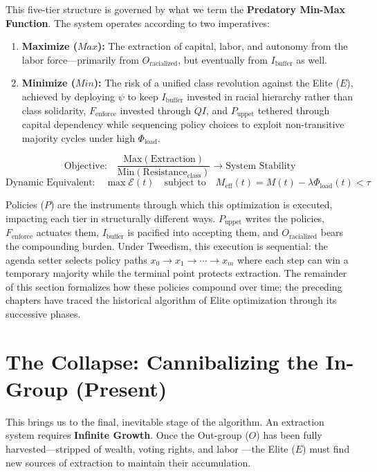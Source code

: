 \documentclass[12pt,openany]{book}
\begin{document}
This five-tier structure is governed by what we term the \textbf{Predatory Min-Max Function}. The system operates according to two imperatives:

\begin{enumerate}
    \item \textbf{Maximize ($Max$):} The extraction of capital, labor, and autonomy from the labor force---primarily from $O_{\text{racialized}}$, but eventually from $I_{\text{buffer}}$ as well.
    \item \textbf{Minimize ($Min$):} The risk of a unified class revolution against the Elite ($E$), achieved by deploying $\psi$ to keep $I_{\text{buffer}}$ invested in racial hierarchy rather than class solidarity, $F_{\text{enforce}}$ invested through $QI$, and $P_{\text{uppet}}$ tethered through capital dependency while sequencing policy choices to exploit non-transitive majority cycles under high $\Phi_{\text{load}}$.
\end{enumerate}

\[
\text{Objective:} \quad \frac{\text{Max}(\text{Extraction})}{\text{Min}(\text{Resistance}_{\text{class}})} \rightarrow \text{System Stability}
\]
\[
\text{Dynamic Equivalent:} \quad \max \mathcal{E}(t) \quad \text{subject to} \quad M_{\text{eff}}(t)=M(t)-\lambda\Phi_{\text{load}}(t)<\tau
\]

Policies ($P$) are the instruments through which this optimization is executed, impacting each tier in structurally different ways. $P_{\text{uppet}}$ writes the policies, $F_{\text{enforce}}$ actuates them, $I_{\text{buffer}}$ is pacified into accepting them, and $O_{\text{racialized}}$ bears the compounding burden. Under Tweedism, this execution is sequential: the agenda setter selects policy paths $x_0 \rightarrow x_1 \rightarrow \cdots \rightarrow x_m$ where each step can win a temporary majority while the terminal point protects extraction. The remainder of this section formalizes how these policies compound over time; the preceding chapters have traced the historical algorithm of Elite optimization through its successive phases.
\section{The Collapse: Cannibalizing the In-Group (Present)}
This brings us to the final, inevitable stage of the algorithm. An extraction system requires \textbf{Infinite Growth}. Once the Out-group ($O$) has been fully harvested---stripped of wealth, voting rights, and labor \cite{coates}---the Elite ($E$) must find new sources of extraction to maintain their accumulation.
\end{document}
